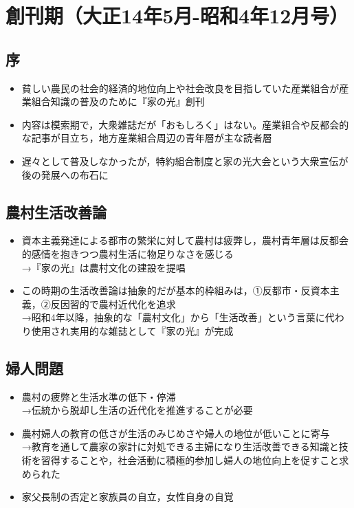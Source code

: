 \documentclass[11pt,autodetect-engine]{jsarticle}%
\begin{document}
\section{創刊期（大正14年5月-昭和4年12月号）}

 \subsection{序 }
  \begin{itemize}
  \item 貧しい農民の社会的経済的地位向上や社会改良を目指していた産業組合が産業組合知識の普及のために『家の光』創刊
  \item 内容は模索期で，大衆雑誌だが「おもしろく」はない。産業組合や反都会的な記事が目立ち，地方産業組合周辺の青年層が主な読者層
  \item 遅々として普及しなかったが，特約組合制度と家の光大会という大衆宣伝が後の発展への布石に
\end{itemize}

 \subsection{農村生活改善論 }
 
 \begin{itemize}
  \item 資本主義発達による都市の繁栄に対して農村は疲弊し，農村青年層は反都会的感情を抱きつつ農村生活に物足りなさを感じる
  \\→『家の光』は農村文化の建設を提唱
  \item この時期の生活改善論は抽象的だが基本的枠組みは，①反都市・反資本主義，②反因習的で農村近代化を追求
  \\→昭和4年以降，抽象的な「農村文化」から「生活改善」という言葉に代わり使用され実用的な雑誌として『家の光』が完成
\end{itemize}

 \subsection{婦人問題 }
 
 \begin{itemize}
  \item 農村の疲弊と生活水準の低下・停滞
  \\→伝統から脱却し生活の近代化を推進することが必要
  \item 農村婦人の教育の低さが生活のみじめさや婦人の地位が低いことに寄与
  \\→教育を通して農家の家計に対処できる主婦になり生活改善できる知識と技術を習得することや，社会活動に積極的参加し婦人の地位向上を促すこと求められた
  \item 家父長制の否定と家族員の自立，女性自身の自覚
\end{itemize}
\end{document}
